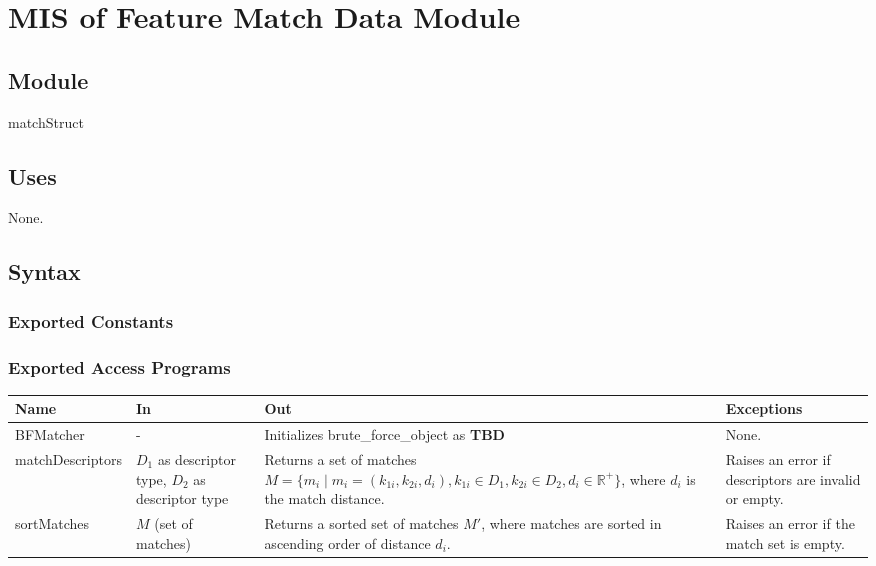 \documentclass[12pt, titlepage]{article}
\begin{document}
\section{MIS of Feature Match Data Module} \label{mFMD}


\subsection{Module}

matchStruct

\subsection{Uses}
None.

\subsection{Syntax}

\subsubsection{Exported Constants}

\subsubsection{Exported Access Programs}

\begin{center}
  \begin{tabular}{p{3cm} p{4cm} p{5cm} p{3cm}}
  \hline
  \textbf{Name} & \textbf{In} & \textbf{Out} & \textbf{Exceptions} \\
  \hline
  BFMatcher & - & Initializes brute\_force\_object \newline 
  as \textbf{TBD} & None.\\
  \hline
  matchDescriptors & $D_1$ as descriptor type, $D_2$ as descriptor type & Returns a set of matches $M = \{ m_i \mid m_i = (k_{1i}, k_{2i}, d_i), k_{1i} \in D_1, k_{2i} \in D_2, d_i \in \mathbb{R}^+ \}$, where $d_i$ is the match distance. & Raises an error if descriptors are invalid or empty. \\
  \hline
  sortMatches & $M$ (set of matches) & Returns a sorted set of matches $M'$, where matches are sorted in ascending order of distance $d_i$. & Raises an error if the match set is empty. \\
  \hline
  \end{tabular}
\end{center}
\end{document}
